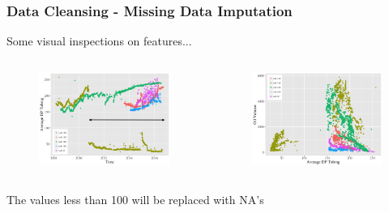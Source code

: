\documentclass[xcolor=table]{beamer}
\begin{document}
\begin{frame}
\frametitle{Data Cleansing - Missing Data Imputation}
\begin{block}{}
Some visual inspections on features...
\end{block}
\begin{columns}[c]

\begin{figure}
\includegraphics[width=1\linewidth,left]{adpt_t.png} 
\end{figure}

\begin{figure}
\includegraphics[width=1\linewidth, right]{o_adpt.png}
\end{figure}
\end{columns}

\begin{block}{}
The values less than 100 will be replaced with NA's
\end{block}
\end{frame}
\end{document}
